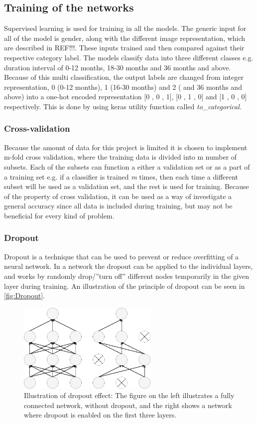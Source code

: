 \subsection{Training of the networks}
Supervised learning is used for training in all the models. The generic input for all of the model is gender, along with the different image representation, which are described in REF!!!. These inputs trained and then compared against their respective category label.   
The models classify data into three different classes e.g. duration interval of 0-12 months, 18-30 months and 36 months and above. Because of this multi classification, the output labels are changed from integer representation, 0 (0-12 months), 1 (16-30 months) and 2 ( and 36 months and above) into a one-hot encoded representation [0 , 0 , 1], [0 , 1 , 0] and [1 , 0 , 0] respectively. This is done by using keras utility function called \textit{to\_categorical}. 


\subsubsection{Cross-validation}
Because the amount of data for this project is limited it is chosen to implement m-fold cross validation, where the training data is divided into m number of subsets. Each of the subsets can function a either a validation set or as a part of a training set e.g. if a classifier is trained \textit{m} times, then each time a different subset will be used as a validation set, and the rest is used for training. \citep{Duda2000}
Because of the property of cross validation, it can be used as a way of investigate a general accuracy since all data is included during training, but may not be beneficial for every kind of problem. \citep{Duda2000}


\subsubsection{Dropout}
Dropout is a technique that can be used to prevent or reduce overfitting of a neural network. In a network the dropout can be applied to the individual layers, and works by randomly drop/”turn off” different nodes temporarily in the given layer during training. An illustration of the principle of dropout can be seen in \autoref{fig:Dropout}.  

\begin{figure} [H]
\centering
\includegraphics[width=0.6\textwidth]{figures/Dropout}
\caption{Illustration of dropout effect: The figure on the left illustrates a fully connected network, without dropout, and the right shows a network where dropout is enabled on the first three layers.}
\label{fig:Dropout}  
\end{figure}

